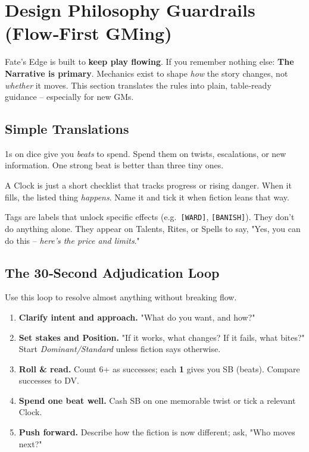 \section{Design Philosophy Guardrails (Flow‑First GMing)}
\label{sec:design-guardrails}

Fate's Edge is built to \textbf{keep play flowing}. If you remember nothing else: \textbf{The Narrative is primary}. 
Mechanics exist to shape \emph{how} the story changes, not \emph{whether} it moves. 
This section translates the rules into plain, table‑ready guidance -- especially for new GMs.

\subsection{Simple Translations}
\begin{description}[leftmargin=1.5em, style=nextline]
  \item[Story Beats (SB) $\Rightarrow$ Story Beats:] 1s on dice give you \emph{beats} to spend. Spend them on twists, escalations, or new information. One strong beat is better than three tiny ones.
  \item[Clocks $\Rightarrow$ Checkboxes/Lists:] A Clock is just a short checklist that tracks progress or rising danger. When it fills, the listed thing \emph{happens}. Name it and tick it when fiction leans that way.
  \item[\texttt{[TAGS]} $\Rightarrow$ Gates with a Cost:] Tags are labels that unlock specific effects (e.g.\ \texttt{[WARD]}, \texttt{[BANISH]}). They don't do anything alone. They appear on Talents, Rites, or Spells to say, "Yes, you can do this -- \emph{here's the price and limits}."
\end{description}

\subsection{The 30‑Second Adjudication Loop}
Use this loop to resolve almost anything without breaking flow.
\begin{enumerate}
  \item \textbf{Clarify intent and approach.} "What do you want, and how?"
  \item \textbf{Set stakes and Position.} "If it works, what changes? If it fails, what bites?" Start \emph{Dominant/Standard} unless fiction says otherwise.
  \item \textbf{Roll \& read.} Count 6+ as successes; each \textbf{1} gives you SB (beats). Compare successes to DV.
  \item \textbf{Spend one beat well.} Cash SB on one memorable twist or tick a relevant Clock.
  \item \textbf{Push forward.} Describe how the fiction is now different; ask, "Who moves next?"
\end{enumerate}

